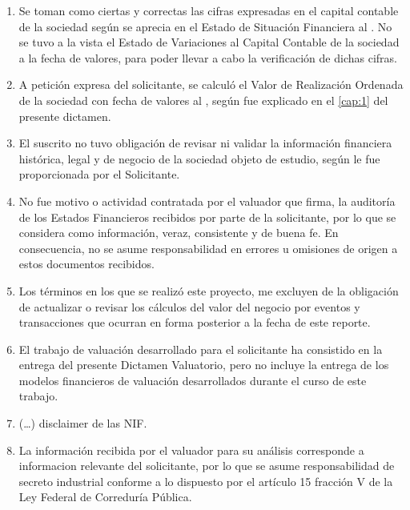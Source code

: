 \begin{enumerate}
\begin{enumerate}
\begin{enumerate}
		\item Se toman como ciertas y correctas las cifras expresadas en el capital contable de la sociedad seg\'un se aprecia en el Estado de Situaci\'on Financiera al \textcolor{principal}{\fechaValores}.  No se tuvo a la vista el Estado de Variaciones al Capital Contable de la sociedad a la fecha de valores, para poder llevar a cabo la verificaci\'on de dichas cifras.

		\item A petici\'on expresa del solicitante, se calcul\'o el Valor de Realizaci\'on Ordenada de la sociedad con fecha de valores al \textcolor{principal}{\fechaValores}, seg\'un fue explicado en el \autoref{cap:1} del presente dictamen.

		\item El suscrito no tuvo obligaci\'on de revisar ni validar la informaci\'on financiera hist\'orica, legal y de negocio de la sociedad objeto de estudio, seg\'un le fue proporcionada por el Solicitante. 

		\item No fue motivo o actividad contratada por el valuador que firma, la auditor\'ia de los Estados Financieros recibidos por parte de la solicitante, por lo que se considera como informaci\'on, veraz, consistente y de buena fe. En consecuencia, no se asume responsabilidad en errores u omisiones de origen a estos documentos recibidos.

		\item Los t\'erminos en los que se realiz\'o este proyecto, me excluyen de la obligaci\'on de actualizar o revisar los c\'alculos del valor del negocio por eventos y transacciones que ocurran en forma posterior a la fecha de este reporte.

		\item El trabajo de valuaci\'on desarrollado para el solicitante ha consistido en la entrega del presente Dictamen Valuatorio, pero no incluye la entrega de los modelos financieros de valuaci\'on desarrollados durante el curso de este trabajo.

		\item (…) disclaimer de las NIF.

		\item La informaci\'on recibida por el valuador para su an\'alisis corresponde a informaci\¡on relevante del solicitante, por lo que se asume responsabilidad de secreto industrial conforme a lo dispuesto por el art\'iculo 15 fracci\'on V de la Ley Federal de Correduría P\'ublica.


\end{enumerate}
\end{enumerate}
\end{enumerate}
